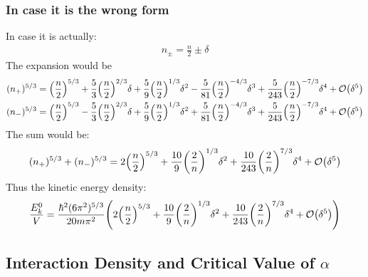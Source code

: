 \documentclass[12pt]{article}
\theoremstyle{plain}
\theoremstyle{definition}
\begin{document}
\subsubsection{In case it is the wrong form}
In case it is actually:
\begin{align*}
  n_\pm=\frac{n}2\pm\delta
\end{align*}
The expansion would be
\begin{align*}
  (n_+)^{5/3}&=
  \qty(\frac{n}2)^{5/3}
  +\frac53\qty(\frac{n}2)^{2/3}\delta
  +\frac59\qty(\frac{n}2)^{1/3}\delta^2
  -\frac5{81}\qty(\frac{n}2)^{-4/3}\delta^3
  +\frac5{243}\qty(\frac{n}2)^{-7/3}\delta^4+\order{\delta^5}\\
  (n_-)^{5/3}&=
  \qty(\frac{n}2)^{5/3}
  -\frac53\qty(\frac{n}2)^{2/3}\delta
  +\frac59\qty(\frac{n}2)^{1/3}\delta^2
  +\frac5{81}\qty(\frac{n}2)^{-4/3}\delta^3
  +\frac5{243}\qty(\frac{n}2)^{-7/3}\delta^4+\order{\delta^5}
\end{align*}
The sum would be:
\begin{align*}
  (n_+)^{5/3}+(n_-)^{5/3}=2\qty(\frac{n}{2})^{5/3}
  +\frac{10}9\qty(\frac2n)^{1/3}\delta^2
  +\frac{10}{243}\qty(\frac2n)^{7/3}\delta^4
  +\order{\delta^5}
\end{align*}
Thus the kinetic energy density:
\begin{align*}
  \frac{E^0_k}{V}=\frac{\hbar^2(6\pi^2)^{5/3}}{20m\pi^2}
  \qty(2\qty(\frac{n}{2})^{5/3}
  +\frac{10}9\qty(\frac2n)^{1/3}\delta^2
  +\frac{10}{243}\qty(\frac2n)^{7/3}\delta^4
  +\order{\delta^5})
\end{align*}
\subsection{Interaction Density and Critical Value of $\alpha$}
\end{document}

